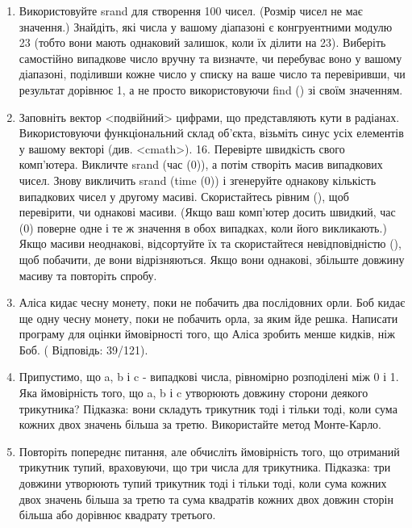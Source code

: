 \documentclass[]{article}
\begin{document}
\begin{enumerate}
\item
Використовуйте srand для створення 100 чисел. (Розмір чисел не має
значення.) Знайдіть, які числа у вашому діапазоні є конгруентними модулю
23 (тобто вони мають однаковий залишок, коли їх ділити на 23). Виберіть
самостійно випадкове число вручну та визначте, чи перебуває воно у
вашому діапазоні, поділивши кожне число у списку на ваше число та
перевіривши, чи результат дорівнює 1, а не просто використовуючи find ()
зі своїм значенням. 

\item
 Заповніть вектор \textless{}подвійний\textgreater{} цифрами, що представляють кути в
радіанах. Використовуючи функціональний склад об'єкта, візьміть синус
усіх елементів у вашому векторі (див. \textless{}cmath\textgreater{}).
16. Перевірте швидкість свого комп'ютера. Викличте srand (час (0)), а
потім створіть масив випадкових чисел. Знову викличить srand (time (0))
і згенеруйте однакову кількість випадкових чисел у другому масиві.
Скористайтесь рівним (), щоб перевірити, чи однакові масиви. (Якщо ваш
комп'ютер досить швидкий, час (0) поверне одне і те ж значення в обох
випадках, коли його викликають.) Якщо масиви неоднакові, відсортуйте їх
та скористайтеся невідповідністю (), щоб побачити, де вони
відрізняються. Якщо вони однакові, збільште довжину масиву та повторіть
спробу.


 \item Аліса кидає чесну монету, поки не побачить два послідовних орли.
Боб кидає ще одну чесну монету, поки не побачить орла, за яким йде решка.
Написати програму для оцінки ймовірності того, що Аліса зробить менше кидків, ніж Боб.
( Відповідь: 39/121).
\item
 Припустимо, що a, b і c - випадкові числа, рівномірно розподілені між 0 і 1.
 Яка ймовірність того, що a, b і c утворюють довжину сторони деякого трикутника?
Підказка: вони складуть трикутник тоді і тільки тоді, коли сума кожних двох значень більша за третю. Використайте метод Монте-Карло.

\item Повторіть попереднє питання, але обчисліть ймовірність того, що отриманий трикутник тупий, враховуючи, що три числа для трикутника.
Підказка: три довжини утворюють тупий трикутник тоді і тільки тоді, коли сума кожних двох значень більша за третю та сума квадратів кожних двох довжин сторін більша або дорівнює квадрату третього.


\end{enumerate}
\end{document}
